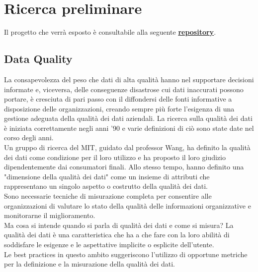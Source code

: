 \documentclass[a4paper,12pt]{article}
\begin{document}
\tableofcontents

\newpage

\section{Ricerca preliminare} 

Il progetto che verrà esposto è consultabile alla seguente \href{https://github.com/ivemberg/Data_quality_experimentation}{\textbf{repository}}.

\subsection{Data Quality}

La consapevolezza del peso che dati di alta qualità hanno nel supportare decisioni informate e, viceversa, delle conseguenze disastrose cui dati inaccurati possono portare, è cresciuta di pari passo con il diffondersi delle fonti informative a disposizione delle organizzazioni, creando sempre più forte l’esigenza di una gestione adeguata della qualità dei dati aziendali. La ricerca sulla qualità dei dati è iniziata correttamente negli anni '90 e varie definizioni di ciò sono state date nel corso degli anni. \\

\noindent Un gruppo di ricerca del MIT, guidato dal professor Wang, ha definito la qualità dei dati come condizione per il loro utilizzo e ha proposto il loro giudizio dipendentemente dai consumatori finali. Allo stesso tempo, hanno definito una "dimensione della qualità dei dati" come un insieme di attributi che rappresentano un singolo aspetto o costrutto della qualità dei dati. \\

\noindent Sono necessarie tecniche di misurazione completa per consentire alle organizzazioni di valutare lo stato della qualità delle informazioni organizzative e monitorarne il miglioramento. \\

\noindent Ma cosa si intende quando si parla di qualità dei dati e come si misura? La qualità dei dati è una caratteristica che ha a che fare con la loro abilità di soddisfare le esigenze e le aspettative implicite o esplicite dell'utente. \\

\noindent Le best practices in questo ambito suggeriscono l’utilizzo di opportune metriche per la definizione e la misurazione della qualità dei dati. \\
\end{document}
